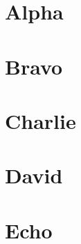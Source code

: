 \documentclass[letterpaper]{latexclasses/tinkermill}
\begin{document}
\maketitle


\newpage
\tableofcontents

\newpage

\section{Alpha}

\lipsum[1]

\section{Bravo}

\lipsum[2-3]

\section{Charlie}

\lipsum[4-5]

\section{David}

\lipsum[6-8]

\section{Echo}

\lipsum[9]
\end{document}
